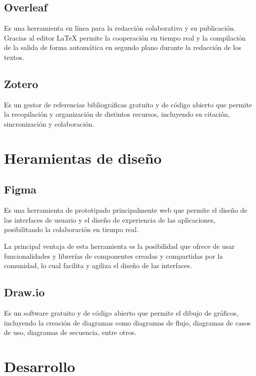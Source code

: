 \subsection{Overleaf}
\cite{Overleaf_bib} Es una herramienta en línea para la redacción colaborativa y su publicación. Gracias al editor LaTeX permite la cooperación en tiempo real y la compilación de la salida de forma automática en segundo plano durante la redacción de los textos.

\subsection{Zotero}
\cite{Zotero_bib} Es un gestor de referencias bibliográficas gratuito y de código abierto que permite la recopilación y organización de distintos recursos, incluyendo su citación, sincronización y colaboración. 

\section{Heramientas de diseño}
\subsection{Figma}
\cite{Figma1_bib} Es una herramienta de prototipado principalmente web que permite el diseño de las interfaces de usuario y el diseño de experiencia de las aplicaciones, posibilitando la colaboración en tiempo real.

\cite{Figma2_bib} La principal ventaja de esta herramienta es la posibilidad que ofrece de usar funcionalidades y librerías de componentes creadas y compartidas por la comunidad, lo cual facilita y agiliza el diseño de las interfaces.

\subsection{Draw.io}
\cite{drawio_bib} Es un software gratuito y de código abierto que permite el dibujo de gráficos, incluyendo la creación de diagramas como diagramas de flujo, diagramas de casos de uso, diagramas de secuencia, entre otros.

\section{Desarrollo}

